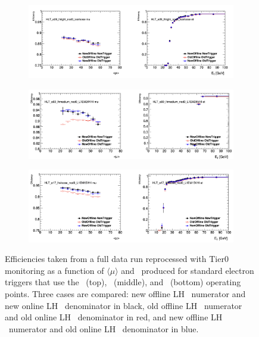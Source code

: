 \begin{figure}[hp]
\centering
  \begin{subfigure}[b]{1.00\textwidth}
    \centering
    \includegraphics[width=1.0\textwidth]{figs/egamma/trig_eff_lhtight.png} 
    \label{fig:egamma:trig_eff_lhtight}
  \end{subfigure}
  \begin{subfigure}[b]{1.00\textwidth}
    \centering
    \includegraphics[width=1.0\textwidth]{figs/egamma/trig_eff_lhmedium.png} 
    \label{fig:egamma:trig_eff_lhmedium}
  \end{subfigure}
  \begin{subfigure}[b]{1.0\textwidth}
    \centering
    \includegraphics[width=1.0\textwidth]{figs/egamma/trig_eff_lhvloose.png} 
    \label{fig:egamma:trig_eff_lhvloose}
  \end{subfigure}
  \caption{Efficiencies taken from a full data run reprocessed with Tier0 monitoring as a function of $\langle\mu\rangle$ and \et\ produced for standard electron triggers that use the \Tight\ (top), \Medium\ (middle), and \VeryLoose\ (bottom) operating points.
  Three cases are compared: new offline LH \tune\ numerator and new online LH \tune\ denominator in black, old offline LH \tune\ numerator and old online LH \tune\ denominator in red, and new offline LH \tune\ numerator and old online LH \tune\ denominator in blue.}
\label{fig:egamma:trig_eff}
\end{figure}
